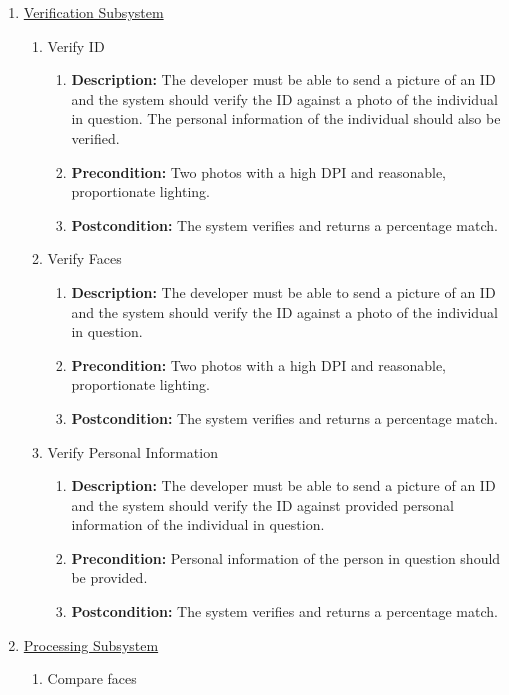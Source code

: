 \documentclass{article}
\begin{document}
		\begin{enumerate}
			\item \underline{Verification Subsystem}
			\begin{enumerate}
				\item Verify ID
				\begin{enumerate}
					\item \textbf{Description:} The developer must be able to send a picture of an ID and the system should verify the ID against a photo of the individual in question. The personal information of the individual should also be verified.
					\item \textbf{Precondition:} Two photos with a high DPI and reasonable, proportionate lighting.
					\item \textbf{Postcondition:} The system verifies and returns a percentage match.
				\end{enumerate}
				\item Verify Faces
				\begin{enumerate}
					\item \textbf{Description:} The developer must be able to send a picture of an ID and the system should verify the ID against a photo of the individual in question.
					\item \textbf{Precondition:} Two photos with a high DPI and reasonable, proportionate lighting.
					\item \textbf{Postcondition:} The system verifies and returns a percentage match.
				\end{enumerate}
				\item Verify Personal Information
				\begin{enumerate}
					\item \textbf{Description:} The developer must be able to send a picture of an ID and the system should verify the ID against provided personal information of the individual in question.
					\item \textbf{Precondition:} Personal information of the person in question should be provided.
					\item \textbf{Postcondition:} The system verifies and returns a percentage match.
				\end{enumerate}
			\end{enumerate}
			\item \underline{Processing Subsystem}
			\begin{enumerate}
				\item Compare faces
				\begin{enumerate}

\end{enumerate}
\end{enumerate}
\end{enumerate}
\end{document}
